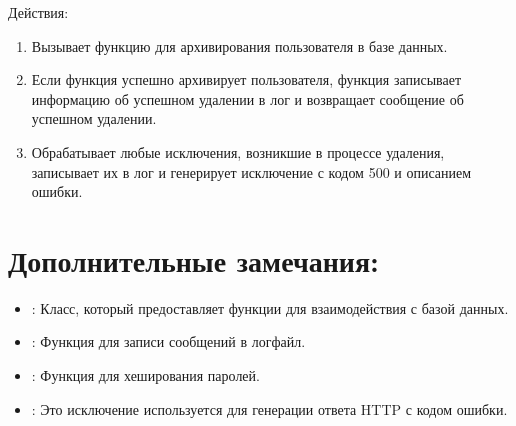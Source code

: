 \documentclass[letterpaper,10pt,russian]{sphinxmanual}
\begin{document}
\sphinxAtStartPar
Действия:
\begin{enumerate}
%
\item {} 
\sphinxAtStartPar
Вызывает функцию  для архивирования пользователя в базе данных.

\item {} 
\sphinxAtStartPar
Если функция  успешно архивирует пользователя, функция записывает информацию об успешном удалении в лог и возвращает сообщение об успешном удалении.

\item {} 
\sphinxAtStartPar
Обрабатывает любые исключения, возникшие в процессе удаления, записывает их в лог и генерирует исключение  с кодом 500 и описанием ошибки.

\end{enumerate}


\section{Дополнительные замечания:}
\label{\detokenize{src/users/users:id2}}\begin{itemize}
\item {} 
\sphinxAtStartPar
{}: Класс, который предоставляет функции для взаимодействия с базой данных.

\item {} 
\sphinxAtStartPar
{}:  Функция для записи сообщений в лог\sphinxhyphen{}файл.

\item {} 
\sphinxAtStartPar
{}:  Функция для хеширования паролей.

\item {} 
\sphinxAtStartPar
{}:  Это исключение используется для генерации ответа HTTP с кодом ошибки.

\end{itemize}
\end{document}

